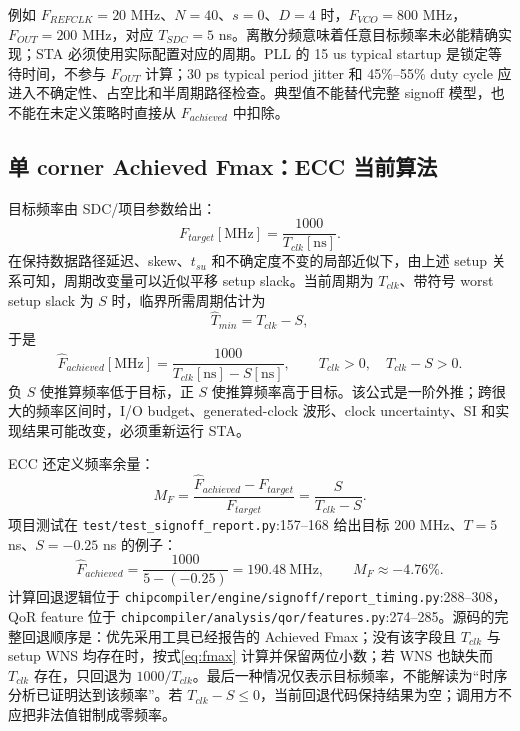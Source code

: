 \documentclass[UTF8,a4paper,11pt,fontset=fandol]{ctexart}
\numberwithin{equation}{section}
\newcommand{\code}[1]{\nolinkurl{#1}}
\begin{document}
例如 $F_{REFCLK}=20$ MHz、$N=40$、$s=0$、$D=4$ 时，$F_{VCO}=800$ MHz，$F_{OUT}=200$ MHz，对应 $T_{SDC}=5$ ns。离散分频意味着任意目标频率未必能精确实现；STA 必须使用实际配置对应的周期。PLL 的 15 us typical startup 是锁定等待时间，不参与 $F_{OUT}$ 计算；30 ps typical period jitter 和 45\%--55\% duty cycle 应进入不确定性、占空比和半周期路径检查。典型值不能替代完整 signoff 模型，也不能在未定义策略时直接从 $F_{achieved}$ 中扣除。

\subsection{单 corner Achieved Fmax：ECC 当前算法}

目标频率由 SDC/项目参数给出：
\begin{equation}
F_{target}[\mathrm{MHz}]=\frac{1000}{T_{clk}[\mathrm{ns}]}.
\end{equation}
在保持数据路径延迟、skew、$t_{su}$ 和不确定度不变的局部近似下，由上述 setup 关系可知，周期改变量可以近似平移 setup slack。当前周期为 $T_{clk}$、带符号 worst setup slack 为 $S$ 时，临界所需周期估计为
\begin{equation}
\widehat{T}_{min}=T_{clk}-S,
\end{equation}
于是
\begin{equation}
\widehat{F}_{achieved}[\mathrm{MHz}]
=\frac{1000}{T_{clk}[\mathrm{ns}]-S[\mathrm{ns}]},
\qquad T_{clk}>0,\quad T_{clk}-S>0.
\label{eq:fmax}
\end{equation}
负 $S$ 使推算频率低于目标，正 $S$ 使推算频率高于目标。该公式是一阶外推；跨很大的频率区间时，I/O budget、generated-clock 波形、clock uncertainty、SI 和实现结果可能改变，必须重新运行 STA。

ECC 还定义频率余量\cite{ecc}：
\begin{equation}
M_F=\frac{\widehat{F}_{achieved}-F_{target}}{F_{target}}
=\frac{S}{T_{clk}-S}.
\end{equation}
项目测试在 \code{test/test_signoff_report.py}:157--168 给出目标 200 MHz、$T=5$ ns、$S=-0.25$ ns 的例子：
\[
\widehat{F}_{achieved}=\frac{1000}{5-(-0.25)}=190.48\ \mathrm{MHz},
\qquad M_F\approx-4.76\%.
\]
计算回退逻辑位于 \code{chipcompiler/engine/signoff/report_timing.py}:288--308，QoR feature 位于 \code{chipcompiler/analysis/qor/features.py}:274--285。源码的完整回退顺序是：优先采用工具已经报告的 Achieved Fmax；没有该字段且 $T_{clk}$ 与 setup WNS 均存在时，按式\eqref{eq:fmax} 计算并保留两位小数；若 WNS 也缺失而 $T_{clk}$ 存在，只回退为 $1000/T_{clk}$。最后一种情况仅表示目标频率，不能解读为“时序分析已证明达到该频率”。若 $T_{clk}-S\le0$，当前回退代码保持结果为空；调用方不应把非法值钳制成零频率。
\end{document}
